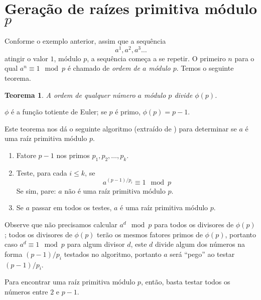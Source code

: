 \documentclass{article}
\newtheorem{theorem}{Teorema}
\theoremstyle{definition}
\begin{document}
\section{Geração de raízes primitiva módulo $p$}

Conforme o exemplo anterior,
assim que a sequência
\begin{equation*}
    a^1, a^2, a^3 \ldots
\end{equation*}
atingir o valor $1$, módulo $p$,
a sequência começa a se repetir.
O primeiro $n$ para o qual $a^n \equiv 1 \mod p$
é chamado de \emph{ordem de $a$ módulo $p$}.
Temos o seguinte teorema.

\begin{theorem}
    A ordem de qualquer número $a$ módulo $p$ divide $\phi(p)$.
\end{theorem}

$\phi$ é a função totiente de Euler;
se $p$ é primo, $\phi(p) = p-1$.

Este teorema nos dá o seguinte algoritmo
(extraído de \cite{PrimitiveRootsStackOverflow})
para determinar se $a$ é uma raíz primitiva módulo $p$.

\begin{enumerate}
    \item Fatore $p-1$ nos primos $p_1, p_2, \ldots, p_k$.
    \item Teste, para cada $i \leq k$, se
        \begin{equation*}
            a^{(p-1)/p_i} \equiv 1 \mod p
        \end{equation*}
        Se sim, pare: $a$ não é uma raíz primitiva módulo $p$.
    \item Se $a$ passar em todos os testes,
        $a$ é uma raíz primitiva módulo $p$.
\end{enumerate}

Observe que não precisamos calcular $a^d \mod p$
para todos os divisores de $\phi(p)$;
todos os divisores de $\phi(p)$ terão os mesmos fatores primos de $\phi(p)$,
portanto caso $a^d \equiv 1 \mod p$ para algum divisor $d$,
este $d$ divide algum dos números na forma $(p-1)/p_i$ testados no algoritmo,
portanto $a$ será ``pego'' ao testar $(p-1)/p_i$.

Para encontrar uma raíz primitiva módulo $p$,
então,
basta testar todos os números entre $2$ e $p-1$.
\end{document}
